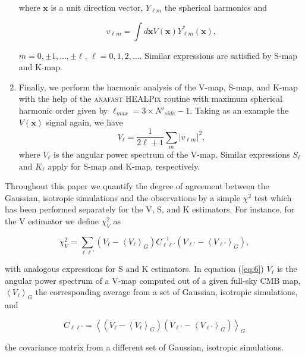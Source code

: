 \begin{enumerate}
\noindent where $\mathbf{x}$ is a unit direction vector, $Y_{\ell m}$ the spherical harmonics and 

\begin{equation}
v_{\ell m} = \int d\mathbf{x} V(\mathbf{x}) Y^*_{\ell m}(\mathbf{x}),
\end{equation}

\noindent $m=0,\pm1,\dots,\pm \ell$, $\ell=0,1,2,\dots$. Similar expressions are satisfied by S-map and K-map. 

\item Finally, we perform the harmonic analysis of the V-map, S-map, and K-map with the help of the \textsc{anafast HEALPix} routine with maximum spherical harmonic order given by $\ell_{max}=3\times N'_{side}-1$. Taking as an example the $V(\mathbf{x})$ signal again, we have 
\begin{equation}
\label{eq:5}
V_\ell = \frac{1}{2 \ell +1} \sum_{m} |v_{\ell m}|^2 ,
\end{equation}
where $V_{\ell}$ is the angular power spectrum of the V-map. Similar expressions  $S_\ell$ and $K_\ell$ apply for S-map and K-map, respectively.
\end{enumerate}

Throughout this paper we quantify the degree of agreement between the Gaussian, isotropic simulations and the observations by a simple $\chi^2$ test which has been performed separately for the V, S, and K estimators. For instance, for the V estimator we define $\chi^2_{V}$ as 

\begin{equation}
\chi^2_{V} = \sum_{\ell \ell'} \left( V_\ell - \left\langle V_\ell \right\rangle_G \right) C^{-1}_{\ell \ell'} \left( V_{\ell'} - \left\langle V_{\ell'} \right\rangle_G\right),
\label{eq:6}
\end{equation}

with analogous expressions for S and K estimators. In equation (\ref{eq:6}) $V_\ell$ is the angular power spectrum of a V-map computed out of a given full-sky CMB map, $\left\langle V_\ell \right\rangle_G$ the corresponding average from a set of Gaussian, isotropic simulations, and 

\begin{equation}
C_{\ell \ell'} = \left\langle \left( V_\ell - \left\langle V_\ell \right\rangle_G \right) \left( V_{\ell'} - \left\langle V_{\ell'} \right\rangle_G \right)\right\rangle_G
\end{equation}

the covariance matrix from a different set of Gaussian, isotropic simulations.

